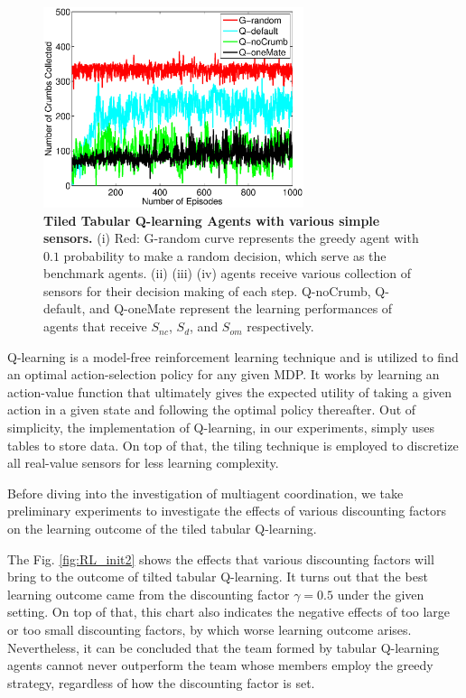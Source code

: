 \documentclass[conference]{IEEEtran}
\begin{document}
\begin{figure}[t]
\centering
\includegraphics[width=3.0in]{./figures/RL/init_setup1.eps}
\caption{\textbf{Tiled Tabular Q-learning Agents with various simple sensors.} (i) Red: G-random curve
    represents the greedy agent with $0.1$ probability to make a random
    decision, which serve as the benchmark agents. 
    (ii) (iii) (iv) agents receive various collection of sensors for their
    decision making of each step. Q-noCrumb, Q-default, and Q-oneMate
    represent the learning performances of agents that receive $S_{nc}$,
    $S_{d}$, and $S_{om}$ respectively.
} 
\label{fig:RL_init}
\end{figure}

Q-learning is a model-free reinforcement learning technique and is utilized to
find an optimal action-selection policy for any given MDP. 
It works by learning an action-value function that ultimately gives the
expected utility of taking a given action in a given state and following the
optimal policy thereafter. 
Out of simplicity, the implementation of Q-learning, in our experiments,
simply uses tables to store data. On top of that, the tiling technique is
employed to discretize all real-value sensors for less learning complexity. 

Before diving into the investigation of multiagent coordination, we take 
preliminary experiments to investigate the effects of various discounting
factors on the learning outcome of the tiled tabular Q-learning.

The Fig. \ref{fig:RL_init2} shows the effects that various discounting factors
will bring to the outcome of tilted tabular Q-learning. It turns out that the
best learning outcome came from the discounting factor $\gamma = 0.5$ under
the given setting. On top of that, this chart also indicates the negative
effects of too large or too small discounting factors, by which worse learning
outcome arises. Nevertheless, it can be concluded that the team formed by
tabular Q-learning agents cannot never outperform the team whose members
employ the greedy strategy, regardless of how the discounting factor is set.
\end{document}
